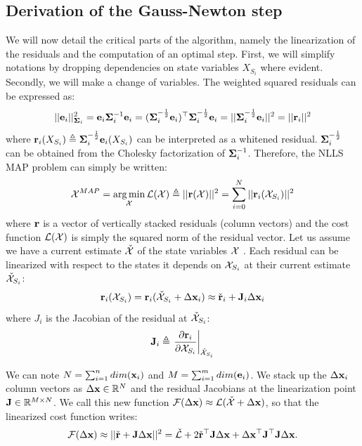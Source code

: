 \subsection{Derivation of the Gauss-Newton step}
\label{sec:gauss_newton_step}
We will now detail the critical parts of the algorithm, namely the linearization of the residuals and the computation of an optimal step.
First, we will simplify notations by dropping dependencies on state variables $X_{S_i}$ where evident. 
Secondly, we will make a change of variables. The weighted squared residuals can be expressed as:
%
\begin{equation}
    ||{\bf e}_i||^2_{{\bm \Sigma}_i} = {\bf e}_i {\bm \Sigma}_i^{-1} {\bf e}_i 
    = ({\bm \Sigma}_i^{-\frac{1}{2}}{\bf e}_i)^{\top}{\bm \Sigma}_i^{-\frac{1}{2}}{\bf e}_i
    = ||{\bm \Sigma}_i^{-\frac{1}{2}}{\bf e}_i||^2 = ||{\bf r}_i||^2
\end{equation}
%
where ${\bf r}_i(X_{S_i}) \triangleq {\bm \Sigma}_i^{-\frac{1}{2}}{\bf e}_i(X_{S_i})$ can be interpreted as a whitened residual. ${\bm \Sigma}_i^{-\frac{1}{2}}$ can be obtained
from the Cholesky factorization of ${\bm \Sigma}_i^{-1}$. Therefore, the NLLS MAP problem can simply be written:
%
\begin{equation}
    \mathcal{X}^{MAP} = \operatorname*{arg\,min}_{\mathcal{X}} \mathcal{L}(\mathcal{X}) \triangleq||{\bf r}(\mathcal{X})||^2 = \sum_{i=0}^N ||{\bf r}_i({\mathcal{X}_{S_i}})||^2 
\end{equation}
%
where ${\bf r}$ is a vector of vertically stacked residuals (column vectors) and the cost function $\mathcal{L}(\mathcal{X})$ is simply the squared norm 
of the residual vector. Let us assume we have a current estimate $\check{\mathcal{X}}$ of the state variables $\mathcal{X}$ .
Each residual can be linearized with respect to the states it depends on $\mathcal{X}_{S_i}$ at their current estimate $\check{\mathcal{X}}_{S_i}$:
%
\begin{equation}
    {\bf r}_i(\mathcal{X}_{S_i}) = {\bf r}_i(\check{\mathcal{X}}_{S_i} + \Delta {\bf x}_i) \approx \check{{\bf r}}_i + {\bf J}_i \Delta {\bf x}_i
\end{equation}
%
where $J_i$ is the Jacobian of the residual at $\check{\mathcal{X}}_{S_i}$: 
%
\begin{equation}
    {\bf J}_i \triangleq \left.\frac{\partial {\bf r}_i}{\partial \mathcal{X}_{S_i}}\right|_{\check{\mathcal{X}}_{S_i}}
    \label{eq:res_jacobian}
\end{equation}

We can note $N = \sum_{i=1}^{n}dim({\bf x}_i)$ and $M = \sum_{i=1}^{m}dim({\bf e}_i)$.
We stack up the $\Delta {\bf x}_i$ column vectors as $\Delta {\bf x} \in \mathbb{R}^N$ and the residual Jacobians at the linearization point 
${\bf J} \in \mathbb{R}^{M \times N}$. We call this new function $\mathcal{F}(\Delta {\bf x}) \approx \mathcal{L}(\check{\mathcal{X}} + \Delta {\bf x})$, so that the linearized cost function writes:  
%
\begin{equation}
    \mathcal{F}(\Delta {\bf x}) \approx ||\check{{\bf r}} + {\bf J} \Delta {\bf x}||^2 
    = \check{\mathcal{L}} +  2\check{{\bf r}}^{\top} {\bf J} \Delta {\bf x} + \Delta {\bf x}^{\top} {\bf J}^{\top} {\bf J} \Delta {\bf x}.
    \label{eq:gaussian_step_quadratic_eq}
\end{equation}

